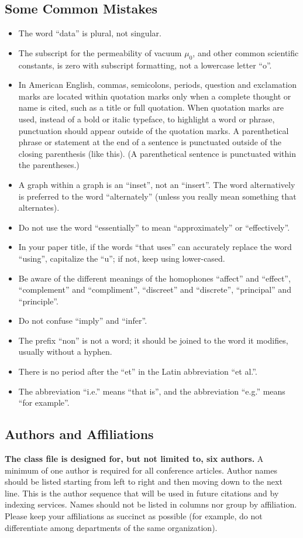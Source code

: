 \documentclass[conference]{IEEEtran}
\begin{document}
\subsection{Some Common Mistakes}\label{SCM}
\begin{itemize}
\item The word ``data'' is plural, not singular.
\item The subscript for the permeability of vacuum $\mu_{0}$, and other common scientific constants, is zero with subscript formatting, not a lowercase letter ``o''.
\item In American English, commas, semicolons, periods, question and exclamation marks are located within quotation marks only when a complete thought or name is cited, such as a title or full quotation. When quotation marks are used, instead of a bold or italic typeface, to highlight a word or phrase, punctuation should appear outside of the quotation marks. A parenthetical phrase or statement at the end of a sentence is punctuated outside of the closing parenthesis (like this). (A parenthetical sentence is punctuated within the parentheses.)
\item A graph within a graph is an ``inset'', not an ``insert''. The word alternatively is preferred to the word ``alternately'' (unless you really mean something that alternates).
\item Do not use the word ``essentially'' to mean ``approximately'' or ``effectively''.
\item In your paper title, if the words ``that uses'' can accurately replace the word ``using'', capitalize the ``u''; if not, keep using lower-cased.
\item Be aware of the different meanings of the homophones ``affect'' and ``effect'', ``complement'' and ``compliment'', ``discreet'' and ``discrete'', ``principal'' and ``principle''.
\item Do not confuse ``imply'' and ``infer''.
\item The prefix ``non'' is not a word; it should be joined to the word it modifies, usually without a hyphen.
\item There is no period after the ``et'' in the Latin abbreviation ``et al.''.
\item The abbreviation ``i.e.'' means ``that is'', and the abbreviation ``e.g.'' means ``for example''.
\end{itemize}

\subsection{Authors and Affiliations}\label{AAA}
\textbf{The class file is designed for, but not limited to, six authors.} A 
minimum of one author is required for all conference articles. Author names 
should be listed starting from left to right and then moving down to the 
next line. This is the author sequence that will be used in future citations 
and by indexing services. Names should not be listed in columns nor group by 
affiliation. Please keep your affiliations as succinct as possible (for 
example, do not differentiate among departments of the same organization).
\end{document}
